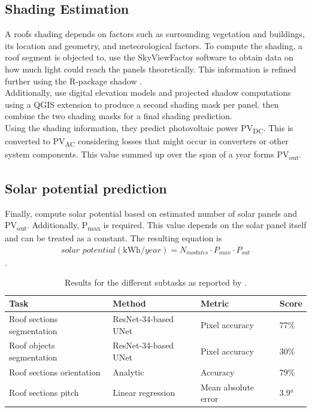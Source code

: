 \documentclass{article} %
\begin{document}
\subsection*{Shading Estimation}
A roofs shading depends on factors such as surrounding vegetation and buildings, its location and geometry, and meteorological factors. To compute the shading, a roof segment is objected to, \citet{de2021predicting} use the SkyViewFactor software \cite{zakvsek2011sky} to obtain data on how much light could reach the panels theoretically. This information is refined further using the R-package shadow \cite{dorman2019shadow}.\\
Additionally, \citet{de2021predicting} use digital elevation models and projected shadow computations using a QGIS extension \cite{qgis,qgisshadows} to produce a second shading mask per panel. \citet{de2021predicting} then combine the two shading masks for a final shading prediction.\\
Using the shading information, they predict photovoltaic power \si{PV_{\si{DC}}}. This is converted to \si{PV_{\si{AC}}} considering losses that might occur in converters or other system components. This value summed up over the span of a year forms \si{PV_{out}}.



\subsection*{Solar potential prediction}
Finally, \citet{de2021predicting} compute solar potential based on estimated number of solar panels and \si{PV_{out}}. Additionally, \si{P_{max}} is required. This value 	depends on the solar panel itself and can be treated as a constant. The resulting equation is
\begin{align*}
	\textit{solar potential} (\si{\kilo\watt \hour \per year}) = N_{\textit{modules}} \cdot \si{P_{max}} \cdot \si{P_{out}}
\end{align*}.


\begin{table}
	\caption{Results for the different subtasks as reported by \citet{de2021predicting}.}
	\label{tab:results}
\begin{tabular}{l|l|l|l}
	Task                       & Method               & Metric              & Score \\ \hline
	Roof sections segmentation & ResNet-34-based UNet & Pixel accuracy      & 77\%  \\ \hline
	Roof objects segmentation  & ResNet-34-based UNet & Pixel accuracy      & 30\%  \\ \hline
	Roof sections orientation  & Analytic             & Accuracy            & 79\%  \\ \hline
	Roof sections pitch        & Linear regression    & Mean absolute error & 3.9°  \\
\end{tabular}
\end{table}
\end{document}
